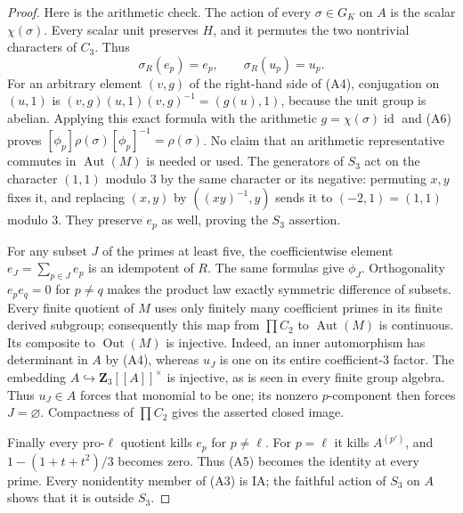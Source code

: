 \begin{proof}
Here is the arithmetic check.  The action of every
$\sigma\in G_K$ on $A$ is the scalar $\chi(\sigma)$.
Every scalar unit preserves $H$, and it permutes the two
nontrivial characters of $C_3$.  Thus
\[
      \sigma_R(e_p)=e_p,
      \qquad \sigma_R(u_p)=u_p.                            \tag{A6}
\]
For an arbitrary element $(v,g)$ of the right-hand side of
(A4), conjugation on $(u,1)$ is
$(v,g)(u,1)(v,g)^{-1}=(g(u),1)$, because the unit group
is abelian.  Applying this exact formula with the
arithmetic $g=\chi(\sigma)\operatorname{id}$ and (A6)
proves $[\phi_p]\rho(\sigma)[\phi_p]^{-1}=\rho(\sigma)$.
No claim that an arithmetic representative commutes in
$\operatorname{Aut}(M)$ is needed or used.
The generators of $S_3$ act on the character $(1,1)$
modulo $3$ by the same character or its negative:
permuting $x,y$ fixes it, and replacing $(x,y)$ by
$((xy)^{-1},y)$ sends it to $(-2,1)=(1,1)$ modulo $3$.
They preserve $e_p$ as well, proving the $S_3$ assertion.

For any subset $J$ of the primes at least five, the
coefficientwise element $e_J=\sum_{p\in J}e_p$ is an
idempotent of $R$.  The same formulas give $\phi_J$.
Orthogonality $e_pe_q=0$ for $p\ne q$ makes the product
law exactly symmetric difference of subsets.  Every
finite quotient of $M$ uses only finitely many coefficient
primes in its finite derived subgroup; consequently this
map from $\prod C_2$ to $\operatorname{Aut}(M)$ is
continuous.  Its composite to $\operatorname{Out}(M)$ is
injective.  Indeed, an inner automorphism has determinant
in $A$ by (A4), whereas $u_J$ is one on its entire
coefficient-$3$ factor.  The embedding
$A\hookrightarrow\mathbf Z_3[[A]]^\times$ is injective,
as is seen in every finite group algebra.  Thus
$u_J\in A$ forces that monomial to be one; its nonzero
$p$-component then forces $J=\varnothing$.
Compactness of $\prod C_2$ gives the asserted closed image.

Finally every pro-$\ell$ quotient kills $e_p$ for
$p\ne\ell$.  For $p=\ell$ it kills $A^{(p')}$, and
$1-(1+t+t^2)/3$ becomes zero.  Thus (A5) becomes the
identity at every prime.  Every nonidentity member of
(A3) is IA; the faithful action of $S_3$ on $A$ shows
that it is outside $S_3$.
\end{proof}

